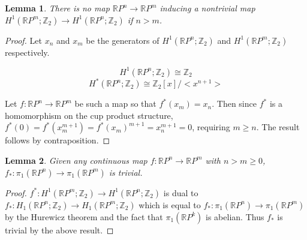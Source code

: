 \documentclass{article}
\newtheorem{lemma}{Lemma}
\begin{document}
\begin{lemma}
There is no map $\mathbb{R} P^n$$\rightarrow$$\mathbb{R} P^m$ inducing a nontrivial map $H^1(\mathbb{R} P^m;\mathbb{Z}_2)\rightarrow H^1(\mathbb{R} P^n;\mathbb{Z}_2)$ if $n>m$.
\end{lemma}
\begin{proof}
Let $x_n$ and $x_m$ be the generators of $H^1(\mathbb{R} P^n;\mathbb{Z}_2)$ and $H^1(\mathbb{R} P^m;\mathbb{Z}_2)$ respectively.

\[H^1(\mathbb{R} P^n;\mathbb{Z}_2)\cong \mathbb{Z}_2\] 
\[H^*(\mathbb{R} P^n;\mathbb{Z}_2)\cong \mathbb{Z}_2[x]/<x^{n+1}>\] 

\noindent Let $f:\mathbb{R} P^n\rightarrow\mathbb{R} P^m $ be such a map so that $f^*(x_m)=x_n$.
Then since $f^*$ is a homomorphism on the cup product structure, $f^*(0)=f^*(x_m^{m+1})=f^*(x_m)^{m+1}=x_n^{m+1}=0$, requiring $m \geq n$. The result follows by contraposition.
\end{proof}

\begin{lemma}
Given any continuous map $f:\mathbb{R}P^n\rightarrow \mathbb{R}P^m$ with $n>m\geq 0$, $f_*:\pi_1(\mathbb{R}P^n)\rightarrow \pi_1(\mathbb{R}P^m)$ is trivial.
\end{lemma}
\begin{proof}
 $f^*:H^1(\mathbb{R}P^m;\mathbb{Z}_2)\rightarrow H^1(\mathbb{R}P^n;\mathbb{Z}_2)$ is dual to $f_*:H_1(\mathbb{R}P^n;\mathbb{Z}_2)\rightarrow H_1(\mathbb{R}P^m;\mathbb{Z}_2)$ which is equal to $f_*:\pi_1(\mathbb{R}P^n)\rightarrow \pi_1(\mathbb{R}P^m)$ by the Hurewicz theorem and the fact that $\pi_1(\mathbb{R}P^k)$ is abelian. Thus $f_*$ is trivial by the above result.
\end{proof}
\end{document}
